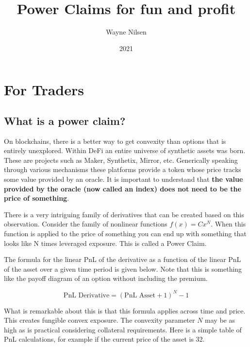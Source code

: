\documentclass[12pt]{article}
\title{Power Claims for fun and profit}
\author{Wayne Nilsen}
\date{2021}
\begin{document}
    \maketitle

    \section{For Traders}

    \subsection{What is a power claim?}

    On blockchains, there is a better way to get convexity than options that is entirely unexplored. Within DeFi an entire universe of synthetic assets was born. These are projects such as Maker, Synthetix, Mirror, etc. Generically speaking through various mechanisms these platforms provide a token whose price tracks some value provided by an oracle. It is important to understand that \textbf{the value provided by the oracle (now called an index) does not need to be the price of something}.

    There is a very intriguing family of derivatives that can be created based on this observation. Consider the family of nonlinear functions $f(x) = C x^N$. When this function is applied to the price of something you can end up with something that looks like N times leveraged exposure. This is called a Power Claim.

    The formula for the linear PnL of the derivative as a function of the linear PnL of the asset over a given time period is given below. Note that this is something like the payoff diagram of an option without including the premium.

    \begin{equation*}
        \text{PnL Derivative} = (\text{PnL Asset} + 1)^N - 1
    \end{equation*}

    What is remarkable about this is that this formula applies across time and price. This creates fungible convex exposure. The convexity parameter $N$ may be as high as is practical considering collateral requirements. Here is a simple table of PnL calculations, for example if the current price of the asset is 32.
\end{document}
